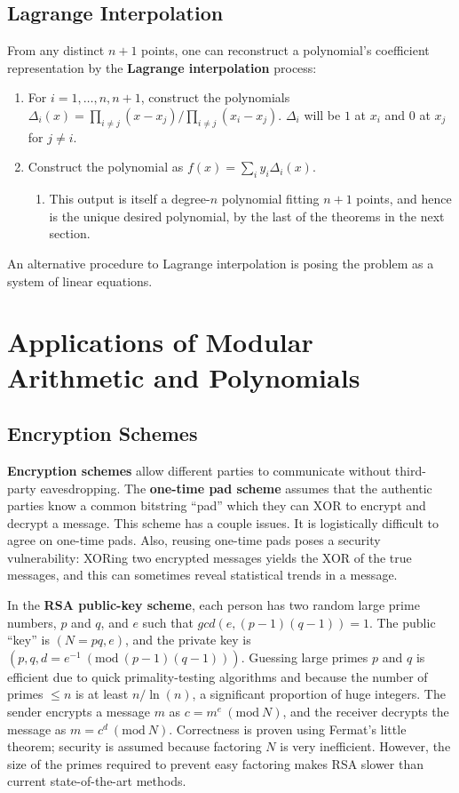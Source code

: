 \documentclass[12pt]{article}
\begin{document}
\subsection{Lagrange Interpolation}

From any distinct $n + 1$ points, one can reconstruct a polynomial's coefficient representation by the \textbf{Lagrange interpolation} process:
\begin{enumerate}
\item For $i = 1, \ldots, n, n + 1$, construct the polynomials $\Delta_i (x) = \prod_{i \neq j} (x - x_j) / \prod_{i \neq j} (x_i - x_j)$. $\Delta_i$ will be $1$ at $x_i$ and $0$ at $x_j$ for $j \neq i$.
\item Construct the polynomial as $f(x) = \sum_i y_i \Delta_i (x)$.
\begin{enumerate}
\item This output is itself a degree-$n$ polynomial fitting $n + 1$ points, and hence is the unique desired polynomial, by the last of the theorems in the next section.
\end{enumerate}
\end{enumerate}
An alternative procedure to Lagrange interpolation is posing the problem as a system of linear equations.

\section{Applications of Modular Arithmetic and Polynomials}

\subsection{Encryption Schemes}

\textbf{Encryption schemes} allow different parties to communicate without third-party eavesdropping. The \textbf{one-time pad scheme} assumes that the authentic parties know a common bitstring ``pad'' which they can $\mathrm{XOR}$ to encrypt and decrypt a message. This scheme has a couple issues. It is logistically difficult to agree on one-time pads. Also, reusing one-time pads poses a security vulnerability: XORing two encrypted messages yields the XOR of the true messages, and this can sometimes reveal statistical trends in a message.

In the \textbf{RSA public-key scheme}, each person has two random large prime numbers, $p$ and $q$, and $e$ such that $gcd\left(e, (p - 1)(q - 1)\right) = 1$. The public ``key'' is $(N = pq, e)$, and the private key is $\left(p, q, d = e^{-1}\ (\mathrm{mod}\ (p - 1)(q - 1))\right)$. Guessing large primes $p$ and $q$ is efficient due to quick primality-testing algorithms and because the number of primes $\leq n$ is at least $n/\ln(n)$, a significant proportion of huge integers. The sender encrypts a message $m$ as $c = m^e\ (\mathrm{mod}\ N)$, and the receiver decrypts the message as $m = c^d\ (\mathrm{mod}\ N)$. Correctness is proven using Fermat's little theorem; security is assumed because factoring $N$ is very inefficient. However, the size of the primes required to prevent easy factoring makes RSA slower than current state-of-the-art methods.
\end{document}
